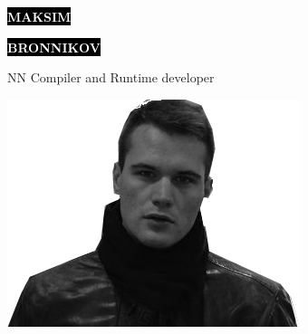 \documentclass[9pt]{developercv} %
\begin{document}

\begin{minipage}[t]{0.55\textwidth} %
	\vspace{-\baselineskip} %
	
	\colorbox{black}{{\HUGE\textcolor{white}{\textbf{\MakeUppercase{Maksim}}}}} %
	
	\colorbox{black}{{\HUGE\textcolor{white}{\textbf{\MakeUppercase{Bronnikov}}}}} %
	
	\vspace{7pt}
	
	{\huge NN Compiler and Runtime developer} %
	
\end{minipage}
\begin{minipage}[t]{0.5\textwidth} %
	\vspace{-\baselineskip} %
	
	\hspace*{4cm}\includegraphics[scale = 0.4]{max.png}\\
	
\end{minipage}

\vspace{0.2cm}
\end{document}
